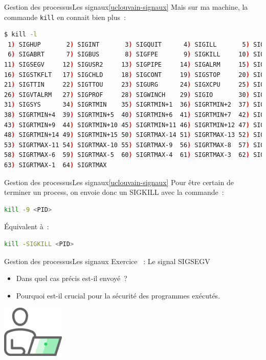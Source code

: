 \documentclass{beamer}
\begin{document}
    \begin{frame}[fragile]{Gestion des processus}{Les signaux\cref{uclouvain-signaux}}
        Mais sur ma machine, la commande \lstinline{kill} en connait bien plus~:
        \begin{lstlisting}[language=bash]
$ kill -l
 1) SIGHUP       2) SIGINT       3) SIGQUIT      4) SIGILL       5) SIGTRAP
 6) SIGABRT      7) SIGBUS       8) SIGFPE       9) SIGKILL     10) SIGUSR1
11) SIGSEGV     12) SIGUSR2     13) SIGPIPE     14) SIGALRM     15) SIGTERM
16) SIGSTKFLT   17) SIGCHLD     18) SIGCONT     19) SIGSTOP     20) SIGTSTP
21) SIGTTIN     22) SIGTTOU     23) SIGURG      24) SIGXCPU     25) SIGXFSZ
26) SIGVTALRM   27) SIGPROF     28) SIGWINCH    29) SIGIO       30) SIGPWR
31) SIGSYS      34) SIGRTMIN    35) SIGRTMIN+1  36) SIGRTMIN+2  37) SIGRTMIN+3
38) SIGRTMIN+4  39) SIGRTMIN+5  40) SIGRTMIN+6  41) SIGRTMIN+7  42) SIGRTMIN+8
43) SIGRTMIN+9  44) SIGRTMIN+10 45) SIGRTMIN+11 46) SIGRTMIN+12 47) SIGRTMIN+13
48) SIGRTMIN+14 49) SIGRTMIN+15 50) SIGRTMAX-14 51) SIGRTMAX-13 52) SIGRTMAX-12
53) SIGRTMAX-11 54) SIGRTMAX-10 55) SIGRTMAX-9  56) SIGRTMAX-8  57) SIGRTMAX-7
58) SIGRTMAX-6  59) SIGRTMAX-5  60) SIGRTMAX-4  61) SIGRTMAX-3  62) SIGRTMAX-2
63) SIGRTMAX-1  64) SIGRTMAX
        \end{lstlisting}
    \end{frame}

    \begin{frame}[fragile]{Gestion des processus}{Les signaux\cref{uclouvain-signaux}}
        Pour être certain de terminer un process, on envoie donc un SIGKILL avec la commande~:
        \begin{lstlisting}[language=bash]
kill -9 <PID>
        \end{lstlisting}
        Équivalent à~:
        \begin{lstlisting}[language=bash]
kill -SIGKILL <PID>
        \end{lstlisting}
    \end{frame}

    \begin{frame}{Gestion des processus}{Les signaux}
        Exercice \execcounterdispinc{}~:
        Le signal SIGSEGV
        \begin{itemize}
            \item Dans quel cas précis est-il envoyé~?
            \item Pourquoi est-il crucial pour la sécurité des programmes exécutés.
        \end{itemize}
        \bigbreak
        \centering
        \includegraphics[width=3cm]{image/guy-in-front-of-desktop}
    \end{frame}
\end{document}
